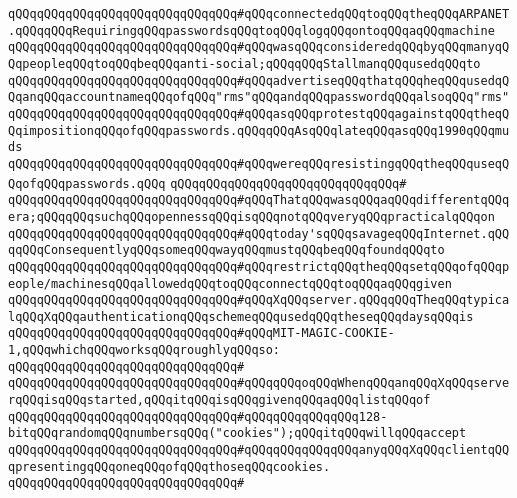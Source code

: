 \verb|qQQqqQQqqQQqqQQqqQQqqQQqqQQqqQQq#qQQqconnectedqQQqtoqQQqtheqQQqARPANET.qQQqqQQqRequiringqQQqpasswordsqQQqtoqQQqlogqQQqontoqQQqaqQQqmachine|\newline
\verb|qQQqqQQqqQQqqQQqqQQqqQQqqQQqqQQq#qQQqwasqQQqconsideredqQQqbyqQQqmanyqQQqpeopleqQQqtoqQQqbeqQQqanti-social;qQQqqQQqStallmanqQQqusedqQQqto|\newline
\verb|qQQqqQQqqQQqqQQqqQQqqQQqqQQqqQQq#qQQqadvertiseqQQqthatqQQqheqQQqusedqQQqanqQQqaccountnameqQQqofqQQq"rms"qQQqandqQQqpasswordqQQqalsoqQQq"rms"|\newline
\verb|qQQqqQQqqQQqqQQqqQQqqQQqqQQqqQQq#qQQqasqQQqprotestqQQqagainstqQQqtheqQQqimpositionqQQqofqQQqpasswords.qQQqqQQqAsqQQqlateqQQqasqQQq1990qQQqmuds|\newline
\verb|qQQqqQQqqQQqqQQqqQQqqQQqqQQqqQQq#qQQqwereqQQqresistingqQQqtheqQQquseqQQqofqQQqpasswords.qQQq|\newline
\verb|qQQqqQQqqQQqqQQqqQQqqQQqqQQqqQQq#|\newline
\verb|qQQqqQQqqQQqqQQqqQQqqQQqqQQqqQQq#qQQqThatqQQqwasqQQqaqQQqdifferentqQQqera;qQQqqQQqsuchqQQqopennessqQQqisqQQqnotqQQqveryqQQqpracticalqQQqon|\newline
\verb|qQQqqQQqqQQqqQQqqQQqqQQqqQQqqQQq#qQQqtoday'sqQQqsavageqQQqInternet.qQQqqQQqConsequentlyqQQqsomeqQQqwayqQQqmustqQQqbeqQQqfoundqQQqto|\newline
\verb|qQQqqQQqqQQqqQQqqQQqqQQqqQQqqQQq#qQQqrestrictqQQqtheqQQqsetqQQqofqQQqpeople/machinesqQQqallowedqQQqtoqQQqconnectqQQqtoqQQqaqQQqgiven|\newline
\verb|qQQqqQQqqQQqqQQqqQQqqQQqqQQqqQQq#qQQqXqQQqserver.qQQqqQQqTheqQQqtypicalqQQqXqQQqauthenticationqQQqschemeqQQqusedqQQqtheseqQQqdaysqQQqis|\newline
\verb|qQQqqQQqqQQqqQQqqQQqqQQqqQQqqQQq#qQQqMIT-MAGIC-COOKIE-1,qQQqwhichqQQqworksqQQqroughlyqQQqso:|\newline
\verb|qQQqqQQqqQQqqQQqqQQqqQQqqQQqqQQq#|\newline
\verb|qQQqqQQqqQQqqQQqqQQqqQQqqQQqqQQq#qQQqqQQqoqQQqWhenqQQqanqQQqXqQQqserverqQQqisqQQqstarted,qQQqitqQQqisqQQqgivenqQQqaqQQqlistqQQqof|\newline
\verb|qQQqqQQqqQQqqQQqqQQqqQQqqQQqqQQq#qQQqqQQqqQQqqQQq128-bitqQQqrandomqQQqnumbersqQQq("cookies");qQQqitqQQqwillqQQqaccept|\newline
\verb|qQQqqQQqqQQqqQQqqQQqqQQqqQQqqQQq#qQQqqQQqqQQqqQQqanyqQQqXqQQqclientqQQqpresentingqQQqoneqQQqofqQQqthoseqQQqcookies.|\newline
\verb|qQQqqQQqqQQqqQQqqQQqqQQqqQQqqQQq#|\newline
